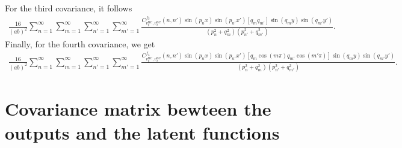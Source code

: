 \documentclass[a4paper,10pt]{article}
\begin{document}
For the third covariance, it follows
\begin{align*}   
\frac{16}{(ab)^2}\sum_{n=1}^\infty\sum_{m=1}^\infty \sum_{n'=1}^\infty
\sum_{m'=1}^\infty\frac{C^{f_3}_{v^{\text{BC}}_q,v^{\text{BC}}_s}(n,n')\sin\left(p_n x\right)\sin\left(p_{n'} x'\right)
    [q_m q_{m'}]\sin\left(q_m y\right)\sin\left(q_{m'} y'\right)}
    {(p_n^2 + q_m^2)(p_{n'}^2 + q_{m'}^2)}.
\end{align*}
Finally, for the fourth covariance, we get
\begin{align*}   
\frac{16}{(ab)^2}\sum_{n=1}^\infty\sum_{m=1}^\infty \sum_{n'=1}^\infty
\sum_{m'=1}^\infty\frac{C^{f_4}_{v^{\text{BC}}_q,v^{\text{BC}}_s}(n,n')\sin\left(p_n x\right)\sin\left(p_{n'} x'\right)
      [q_m \cos(m\pi)q_{m'}\cos(m'\pi)]\sin\left(q_m y\right)\sin\left(q_{m'} y'\right)}
    {(p_n^2 + q_m^2)(p_{n'}^2 + q_{m'}^2)}.
\end{align*}


\section{Covariance matrix bewteen the outputs and the latent functions}
\end{document}
